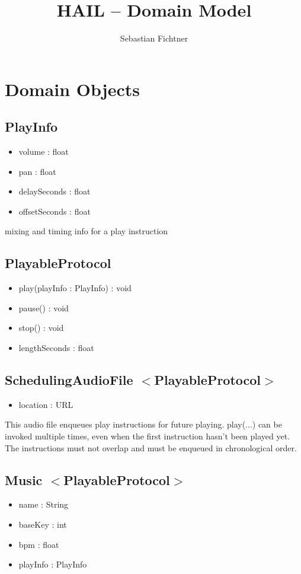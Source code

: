 \documentclass[12pt]{article}
\title{HAIL -- Domain Model}
\author{Sebastian Fichtner}
\date{}
\begin{document}
\maketitle

\section{Domain Objects}

\subsection*{PlayInfo}
\begin{itemize}
\item volume : float
\item pan : float
\item delaySeconds : float
\item offsetSeconds : float
\end{itemize}

mixing and timing info for a play instruction

\subsection*{PlayableProtocol}
\begin{itemize}
\item play(playInfo : PlayInfo) : void
\item pause() : void
\item stop() : void
\item lengthSeconds : float
\end{itemize}

\subsection*{SchedulingAudioFile $<$PlayableProtocol$>$}
\begin{itemize}
\item location : URL
\end{itemize}

This audio file enqueues play instructions for future playing. play(...) can be invoked multiple times, even when the first instruction hasn't been played yet. The instructions must not overlap and must be enqueued in chronological order.

\subsection*{Music $<$PlayableProtocol$>$}
\begin{itemize}
\item name : String
\item baseKey : int
\item bpm : float
\item playInfo : PlayInfo
\end{itemize}
\end{document}
